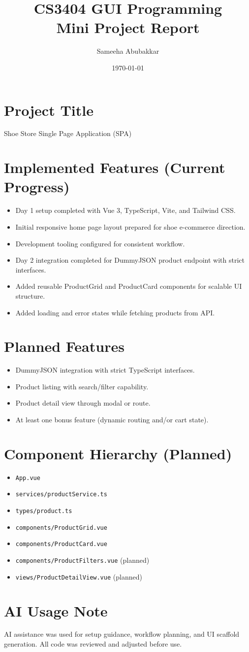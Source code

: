 \documentclass[12pt,a4paper]{article}
\title{CS3404 GUI Programming\\Mini Project Report}
\author{Sameeha Abubakkar}
\date{\today}
\begin{document}
\maketitle

\section{Project Title}
Shoe Store Single Page Application (SPA)

\section{Implemented Features (Current Progress)}
\begin{itemize}[leftmargin=*]
  \item Day 1 setup completed with Vue 3, TypeScript, Vite, and Tailwind CSS.
  \item Initial responsive home page layout prepared for shoe e-commerce direction.
  \item Development tooling configured for consistent workflow.
  \item Day 2 integration completed for DummyJSON product endpoint with strict interfaces.
  \item Added reusable ProductGrid and ProductCard components for scalable UI structure.
  \item Added loading and error states while fetching products from API.
\end{itemize}

\section{Planned Features}
\begin{itemize}[leftmargin=*]
  \item DummyJSON integration with strict TypeScript interfaces.
  \item Product listing with search/filter capability.
  \item Product detail view through modal or route.
  \item At least one bonus feature (dynamic routing and/or cart state).
\end{itemize}

\section{Component Hierarchy (Planned)}
\begin{itemize}[leftmargin=*]
  \item \texttt{App.vue}
  \item \texttt{services/productService.ts}
  \item \texttt{types/product.ts}
  \item \texttt{components/ProductGrid.vue}
  \item \texttt{components/ProductCard.vue}
  \item \texttt{components/ProductFilters.vue} (planned)
  \item \texttt{views/ProductDetailView.vue} (planned)
\end{itemize}

\section{AI Usage Note}
AI assistance was used for setup guidance, workflow planning, and UI scaffold generation. All code was reviewed and adjusted before use.
\end{document}
